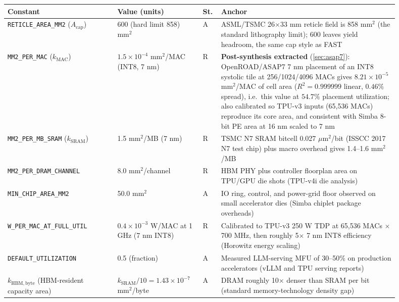 \begin{table}[h]
\centering
\footnotesize
\begin{tabular}{@{}p{0.26\linewidth}p{0.17\linewidth}p{0.045\linewidth}p{0.42\linewidth}@{}}
\toprule
Constant & Value (units) & St. & Anchor \\
\midrule
\texttt{RETICLE\_AREA\_MM2} ($A_{\mathrm{cap}}$) & 600 (hard limit 858) $\mathrm{mm}^2$ & A & ASML/TSMC 26$\times$33 mm reticle field is 858 $\mathrm{mm}^2$ (the standard lithography limit); 600 leaves yield headroom, the same cap style as FAST \citep{zhang_fast} \\
\texttt{MM2\_PER\_MAC} ($k_{\mathrm{MAC}}$) & $1.5\times10^{-4}$ $\mathrm{mm}^2$/MAC (INT8, 7 nm) & R & \textbf{Post-synthesis extracted} (\cref{sec:asap7}): OpenROAD/ASAP7 7 nm placement of an INT8 systolic tile at 256/1024/4096 MACs gives $8.21\times10^{-5}$ $\mathrm{mm}^2$/MAC of cell area ($R^2=0.999999$ linear, $0.46\%$ spread), i.e.\ this value at $54.7\%$ placement utilization; also calibrated so TPU-v3 inputs (65{,}536 MACs) reproduce its core area, and consistent with Simba 8-bit PE area at 16 nm scaled to 7 nm \citep{shao2019simba} \\
\texttt{MM2\_PER\_MB\_SRAM} ($k_{\mathrm{SRAM}}$) & 1.5 $\mathrm{mm}^2$/MB (7 nm) & R & TSMC N7 SRAM bitcell 0.027 $\mu\mathrm{m}^2$/bit (ISSCC 2017 N7 test chip) plus macro overhead gives 1.4--1.6 $\mathrm{mm}^2$/MB \\
\texttt{MM2\_PER\_DRAM\_CHANNEL} & 8.0 $\mathrm{mm}^2$/channel & R & HBM PHY plus controller floorplan area on TPU/GPU die shots (TPU-v4i die analysis) \citep{jouppi2021ten} \\
\texttt{MIN\_CHIP\_AREA\_MM2} & 50.0 $\mathrm{mm}^2$ & A & IO ring, control, and power-grid floor observed on small accelerator dies (Simba chiplet package overheads) \citep{shao2019simba} \\
\texttt{W\_PER\_MAC\_AT\_FULL\_UTIL} & $0.4\times10^{-3}$ W/MAC at 1 GHz (7 nm INT8) & R & Calibrated to TPU-v3 250 W TDP at 65{,}536 MACs $\times$ 700 MHz, then roughly 5$\times$ 7 nm INT8 efficiency (Horowitz energy scaling) \citep{jouppi2021ten} \\
\texttt{DEFAULT\_UTILIZATION} & 0.5 (fraction) & A & Measured LLM-serving MFU of 30--50\% on production accelerators (vLLM and TPU serving reports) \citep{kwon2023vllm} \\
$k_{\mathrm{HBM,byte}}$ (HBM-resident capacity area) & $k_{\mathrm{SRAM}}/10 = 1.43\times10^{-7}$ $\mathrm{mm}^2$/byte & A & DRAM roughly 10$\times$ denser than SRAM per bit (standard memory-technology density gap) \\

\end{tabular}
\end{table}
